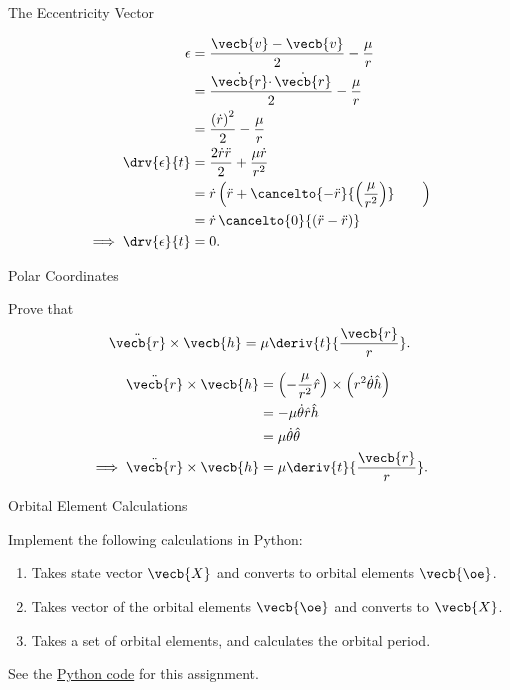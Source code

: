 \begin{hwkProblem}{1}{The Eccentricity Vector}
	\hwkPart{} \label{hwk:s01b}

	\begin{align*}
		\epsilon &= \frac{\vecb{v} - \vecb{v}}{2} - \frac{\mu}{r} \\
		\, &= \frac{\dot{\vecb{r}} \cdotp \dot{\vecb{r}}}{2} - \frac{\mu}{r} \\
		\, &= \frac{\left(\dot{r}\right)^{2}}{2} - \frac{\mu}{r} \\
		\drv{\epsilon}{t} &= \frac{2 \dot{r} \ddot{r}}{2} + \frac{\mu \dot{r}}{r^{2}} \\
		\, &= \dot{r} \left(\ddot{r} + \cancelto{- \ddot{r}}{\left(\frac{\mu}{r^{2}}\right)} \qquad \right)  \\
		\, &= \dot{r} \, \cancelto{0}{\left(\ddot{r} - \ddot{r}\right)} \\
		\implies \drv{\epsilon}{t} &= 0
	.\end{align*}

\end{hwkProblem}

\begin{hwkProblem}{2}{Polar Coordinates} \label{hwk:p02}

	Prove that \[ \ddot{\vecb{r}} \times \vecb{h} = \mu \deriv{t}{\frac{\vecb{r}}{r}} .\]

	\hwkSol{} \label{hwk:s02}

	\begin{align*}
		\ddot{\vecb{r}} \times \vecb{h} &= \left(- \frac{\mu}{r^{2}} \hat{r}\right) \times \left(r^{2} \dot{\theta} \hat{h}\right) \\
		\, &= - \mu \dot{\theta} \hat{r} \hat{h} \\
		\, &= \mu \dot{\theta} \hat{\theta} \\
		\implies \ddot{\vecb{r}} \times \vecb{h} &= \mu \deriv{t}{\frac{\vecb{r}}{r}}
	.\end{align*}

\end{hwkProblem}

\begin{hwkProblem}{3}{Orbital Element Calculations} \label{hwk:p03}

	Implement the following calculations in Python:
	\begin{enumerate}
		\item \label{hwk:p03a} Takes state vector \(\vecb{X}\) and converts to orbital elements \(\vecb{\oe}\).
		\item \label{hwk:p03b} Takes vector of the orbital elements \(\vecb{\oe}\) and converts to \(\vecb{X}\).
		\item \label{hwk:p03c} Takes a set of orbital elements, and calculates the orbital period.
	\end{enumerate}

	\hwkCode{} \label{code:s03}

	See the \href{https://www.github.com/vaisriv/enae441-hw01/blob/main/code/submission.py}{Python code} for this assignment.

\end{hwkProblem}

